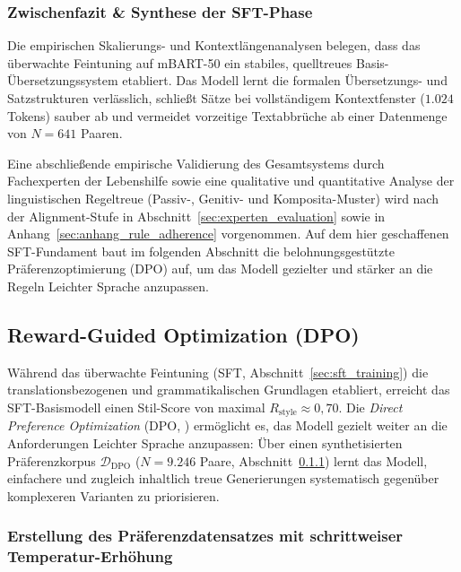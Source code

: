 \subsubsection{Zwischenfazit \& Synthese der SFT-Phase}
\label{sec:sft_synthese}

Die empirischen Skalierungs- und Kontextlängenanalysen belegen, dass das überwachte Feintuning auf mBART-50 ein stabiles, quelltreues Basis-Übersetzungssystem etabliert. Das Modell lernt die formalen Übersetzungs- und Satzstrukturen verlässlich, schließt Sätze bei vollständigem Kontextfenster ($1.024$ Tokens) sauber ab und vermeidet vorzeitige Textabbrüche ab einer Datenmenge von $N = 641$ Paaren.

Eine abschließende empirische Validierung des Gesamtsystems durch Fachexperten der Lebenshilfe sowie eine qualitative und quantitative Analyse der linguistischen Regeltreue (Passiv-, Genitiv- und Komposita-Muster) wird nach der Alignment-Stufe in Abschnitt~\ref{sec:experten_evaluation} sowie in Anhang~\ref{sec:anhang_rule_adherence} vorgenommen. Auf dem hier geschaffenen SFT-Fundament baut im folgenden Abschnitt die belohnungsgestützte Präferenzoptimierung (DPO) auf, um das Modell gezielter und stärker an die Regeln Leichter Sprache anzupassen.

\subsection{Reward-Guided Optimization (DPO)}
\label{sec:dpo_optimization}

Während das überwachte Feintuning (SFT, Abschnitt~\ref{sec:sft_training}) die translationsbezogenen und grammatikalischen Grundlagen etabliert, erreicht das SFT-Basismodell einen Stil-Score von maximal $R_{\text{style}} \approx 0{,}70$. Die \textit{Direct Preference Optimization} (DPO, \citet{rafailov2023direct}) ermöglicht es, das Modell gezielt weiter an die Anforderungen Leichter Sprache anzupassen: Über einen synthetisierten Präferenzkorpus $\mathcal{D}_{\text{DPO}}$ ($N = 9.246$ Paare, Abschnitt~\ref{sec:dpo_preference_generation}) lernt das Modell, einfachere und zugleich inhaltlich treue Generierungen systematisch gegenüber komplexeren Varianten zu priorisieren.

\subsubsection{Erstellung des Präferenzdatensatzes mit schrittweiser Temperatur-Erhöhung}
\label{sec:dpo_preference_generation}

